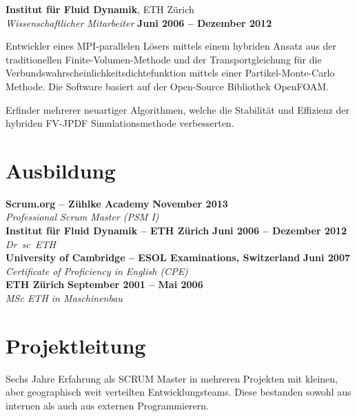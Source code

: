 \documentclass[line,11pt,a4paper]{../resume}
\begin{document}
\begin{resume}
\textbf{Institut für Fluid Dynamik}, ETH Zürich\\\vspace{1mm}%
\textsl{Wissenschaftlicher Mitarbeiter} \hfill \textbf{Juni 2006 -- Dezember 2012}\\
\vspace{-4mm}%
\begin{list2}
  \item Entwickler eines MPI-parallelen Lösers mittels einem hybriden Ansatz aus
    der traditionellen Finite-Volumen-Methode und der Transportgleichung für
    die Verbundswahrscheinlichkeitsdichtefunktion mittels einer
    Partikel-Monte-Carlo Methode. Die Software basiert auf der Open-Source
    Bibliothek OpenFOAM.

  \item Erfinder mehrerer neuartiger Algorithmen, welche die Stabilität und
    Effizienz der hybriden FV-JPDF Simulationsmethode verbesserten.
\end{list2}

\pagebreak
\section{\mysidestyle Ausbildung}\vspace{2mm}

\textbf{Scrum.org -- Zühlke Academy} \hfill \textbf{November 2013}\\
\vspace{1mm}%
\textsl{Professional Scrum Master (PSM I)}\\
\vspace{-1mm}%
%
\textbf{Institut für Fluid Dynamik -- ETH Zürich} \hfill \textbf{Juni 2006 -- Dezember 2012}\\
\vspace{1mm}%
\textsl{Dr\ sc\ ETH}\\
\vspace{-1mm}%
%
\textbf{University of Cambridge -- ESOL Examinations, Switzerland} \hfill \textbf{Juni 2007}\\
\vspace{1mm}%
\textsl{Certificate of Proficiency in English (CPE)}\\
\vspace{-1mm}%
%
\textbf{ETH Zürich} \hfill \textbf{September 2001 -- Mai 2006}\\
\vspace{1mm}%
\textsl{MSc ETH in Maschinenbau}

\section{\mysidestyle Projektleitung}\vspace{6mm}
\begin{list2}
  \item Sechs Jahre Erfahrung als SCRUM Master in mehreren Projekten mit
    kleinen, aber geographisch weit verteilten Entwicklungsteams. Diese
    bestanden sowohl aus internen als auch aus externen Programmierern.


\end{list2}
\end{resume}
\end{document}
